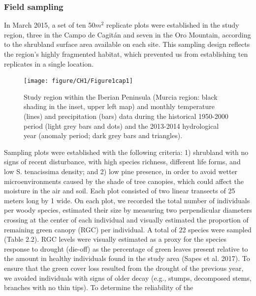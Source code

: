 \documentclass[11pt,twoside]{reedthesis}
\begin{document}
\subsubsection{Field sampling}\label{field-sampling}

In March 2015, a set of ten 50\(m^2\) replicate plots were established
in the study region, three in the Campo de Cagitán and seven in the Oro
Mountain, according to the shrubland surface area available on each
site. This sampling design reflects the region's highly fragmented
habitat, which prevented us from establishing ten replicates in a single
location.\par

\setlength{\abovecaptionskip}{10pt}
\begin{figure}[hbt!]

{\centering \texttt{[image: figure/CH1/Figure1cap1]} 

}

\caption[Study region, monthly temperature and precipitation data during the historical 1950-2000 period]{Study region within the Iberian Peninsula (Murcia region: black shading in the inset, upper left map) and monthly temperature (lines) and precipitation (bars) data during the historical 1950-2000 period (light grey bars and dots) and the 2013-2014 hydrological year (anomaly period; dark grey bars and triangles).}\label{fig:Ch1plot1}
\end{figure}
Sampling plots were established with the following criteria: 1)
shrubland with no signs of recent disturbance, with high species
richness, different life forms, and low S. tenacissima density; and 2)
low pine presence, in order to avoid wetter microenvironments caused by
the shade of tree canopies, which could affect the moisture in the air
and soil. Each plot consisted of two linear transects of 25 meters long
by 1 wide. On each plot, we recorded the total number of individuals per
woody species, estimated their size by measuring two perpendicular
diameters crossing at the center of each individual and visually
estimated the proportion of remaining green canopy (RGC) per individual.
A total of 22 species were sampled (Table 2.2). RGC levels were visually
estimated as a proxy for the species response to drought (die-off) as
the percentage of green leaves present relative to the amount in healthy
individuals found in the study area (Sapes et al. 2017). To ensure that
the green cover loss resulted from the drought of the previous year, we
avoided individuals with signs of older decay (e.g., stumps, decomposed
stems, branches with no thin tips). To determine the reliability of the
\end{document}
